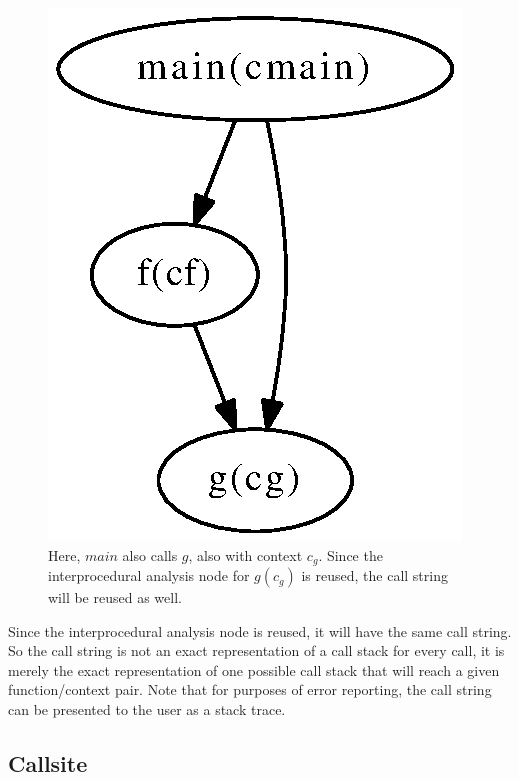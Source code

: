 \begin{figure}[htbp]
\begin{center}
\includegraphics[scale=.6]{Figures/branch.eps}
\caption[A small program showing two calls to a function]{
Here, $main$ also calls $g$, also with context $c_g$. Since the interprocedural analysis node
for $g(c_g)$ is reused, the call string will be reused as well.
}
\label{Fig:callstring}
\end{center}
\end{figure}


Since the interprocedural analysis node is reused, it will have the
same call string. So the call string is not an exact representation of
a call stack for every call, it is merely the exact representation of
one possible call stack that will reach a given function/context
pair. Note that for purposes of error reporting, the call string can
be presented to the user as a stack trace.

\subsection{Callsite}
\label{sec:callsites}

